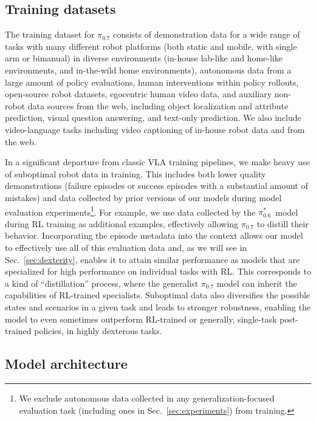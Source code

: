 \documentclass[conference]{IEEEtran}
\def \Piszs {$\pi^{*}_{0.6}$}
\def \MethodName {$\pi_{0.7}$}
\begin{document}
\subsection{Training datasets}



The training dataset for \MethodName{} consists of demonstration data for a wide range of tasks with many different robot platforms (both static and mobile, with single arm or bimanual) in diverse environments (in-house lab-like and home-like environments, and in-the-wild home environments), autonomous data from a large amount of policy evaluations, human interventions within policy rollouts, open-source robot datasets, egocentric human video data, and auxiliary non-robot data sources from the web, including object localization and attribute prediction, visual question answering, and text-only prediction. We also include video-language tasks including video captioning of in-house robot data and from the web.

In a significant departure from classic VLA training pipelines, we make heavy use of suboptimal robot data in training. This includes both lower quality demonstrations (failure episodes or success episodes with a substantial amount of mistakes) and data collected by prior versions of our models during model evaluation experiments\footnote{We exclude autonomous data collected in any generalization-focused evaluation task (including ones in Sec.~\ref{sec:experiments}) from training.}. For example, we use data collected by the \Piszs\ model during RL training as additional examples, effectively allowing \MethodName{} to distill their behavior. Incorporating the episode metadata into the context allows our model to effectively use all of this evaluation data and, as we will see in Sec.~\ref{sec:dexterity}, enables it to attain similar performance as models that are specialized for high performance on individual tasks with RL. This corresponds to a kind of ``distillation'' process, where the generalist \MethodName{} model can inherit the capabilities of RL-trained specialists. Suboptimal data also diversifies the possible states and scenarios in a given task and leads to stronger robustness, enabling the model to even sometimes outperform RL-trained or generally, single-task post-trained policies, in highly dexterous tasks.


\subsection{Model architecture}
\label{subsec:architecture}
\end{document}
